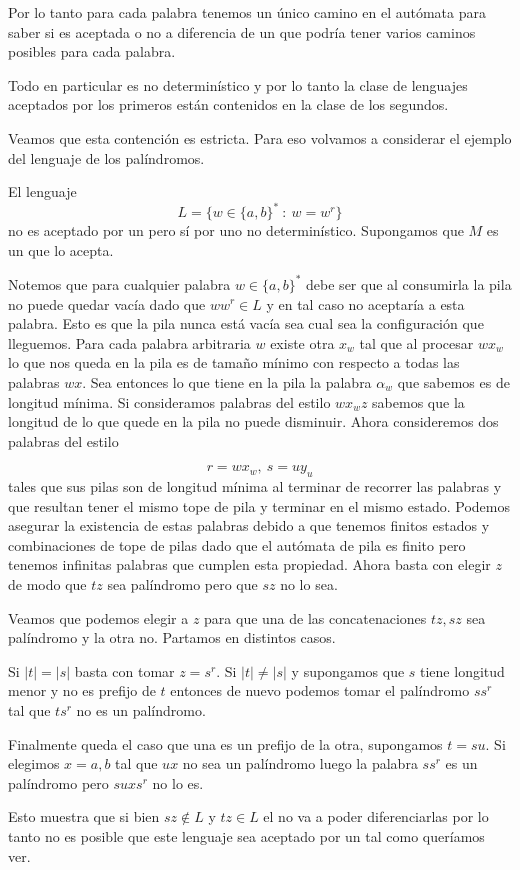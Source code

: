 \documentclass[tesis.tex]{subfiles}
\begin{document}
Por lo tanto para cada palabra tenemos un único camino en el autómata para saber si es aceptada o no a diferencia de un \APND  que podría tener varios caminos posibles para cada palabra.
\begin{obs}
	Todo \APD en particular es no determinístico y por lo tanto la clase de lenguajes aceptados por los primeros están contenidos en la clase de los segundos.
\end{obs}

Veamos que esta contención es estricta. Para eso volvamos a considerar el ejemplo del lenguaje de los palíndromos.
\begin{ej}
	El lenguaje 
	\[
	L = \{ w \in \{ a,b \}^*  \ : \ w = w^r \}
	\]
	 no es aceptado por un \APD pero sí por uno no determinístico. 
	Supongamos que $M$ es un \APD que lo acepta. 
	
	Notemos que para cualquier palabra $w \in \{ a,b \}^*$ debe ser que al consumirla la pila no puede quedar vacía dado que $ww^r \in L$ y en tal caso no aceptaría a esta palabra. 
	Esto es que la pila nunca está vacía sea cual sea la configuración que lleguemos. 
	Para cada palabra arbitraria $w$ existe otra $x_w$ tal que al procesar $wx_w$ lo que nos queda en la pila es de tamaño mínimo con respecto a todas las palabras $wx$. 
	Sea entonces lo que tiene en la pila la palabra $\alpha_w$ que sabemos es de longitud mínima. Si consideramos palabras del estilo $wx_wz$ sabemos que la longitud de lo que quede en la pila no puede disminuir. 
	Ahora consideremos dos palabras del estilo 
	
	\[
	r=wx_w, \ s=uy_u
	\]
	 tales que sus pilas son de longitud mínima al terminar de recorrer las palabras y que resultan tener el mismo tope de pila y terminar en el mismo estado. 
	Podemos asegurar la existencia de estas palabras debido a que tenemos finitos estados y combinaciones de tope de pilas dado que el autómata de pila es finito pero tenemos infinitas palabras que cumplen esta propiedad. 
	Ahora basta con elegir $z$ de modo que $tz$ sea palíndromo pero que $sz$ no lo sea. 
	
	Veamos que podemos elegir a $z$ para que una de las concatenaciones $tz,sz$ sea palíndromo y la otra no. Partamos en distintos casos. 
	
	Si $|t|=|s|$ basta con tomar $z=s^r$. 
	Si $|t|\neq |s|$ y supongamos que $s$ tiene longitud menor y no es prefijo de $t$ entonces de nuevo podemos tomar el palíndromo $ss^r$ tal que $ts^r$ no es un palíndromo.
	 
	Finalmente queda el caso que una es un prefijo de la otra, supongamos $t=su$. 
	Si elegimos $x=a,b$ tal que $ux$ no sea un palíndromo luego la palabra $ss^r$ es un palíndromo pero $suxs^r$ no lo es.
	
	Esto muestra que si bien $sz \notin L$ y $tz \in L$ el \APD no va a poder diferenciarlas por lo tanto no es posible que este lenguaje sea aceptado por un \APD tal como queríamos ver.
	
\end{ej}
\end{document}
